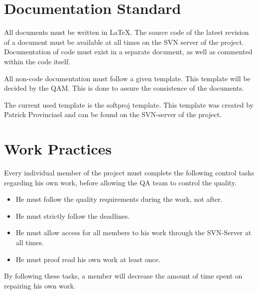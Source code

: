 \documentclass[salesmen, twoside]{../../../templates/latex/2009/softproj}
\begin{document}
\begin{projdoc}
\section{Documentation Standard}
All documents must be written in LaTeX. The source code of the latest revision of a document must be available at all times on the SVN server of the project. Documentation of code must exist in a separate document, as well as commented within the code itself.

All non-code documentation must follow a given template. This template will be decided by the QAM. This is done to assure the consistence of the documents.

The current used template is the softproj template. This template was created by Patrick Provinciael and can be found on the SVN-server of the project.

\section{Work Practices}
Every individual member of the project must complete the following control tasks regarding his own work, before allowing the QA team to control the quality.
\begin{itemize}
\item He must follow the quality requirements during the work, not after.
\item He must strictly follow the deadlines.
\item He must allow access for all members to his work through the SVN-Server at all times.
\item He must proof read his own work at least once.
\end{itemize}
By following these tasks, a member will decrease the amount of time spent on repairing his own work.


\end{projdoc}
\end{document}
